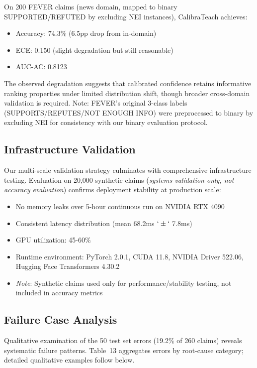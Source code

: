 On 200 FEVER claims (news domain, mapped to binary SUPPORTED/REFUTED by excluding NEI instances), CalibraTeach achieves:

\begin{itemize}
\item
  Accuracy: 74.3\% (6.5pp drop from in-domain)
\item
  ECE: 0.150 (slight degradation but still reasonable)
\item
  AUC-AC: 0.8123
\end{itemize}

The observed degradation suggests that calibrated confidence retains informative ranking properties under limited distribution shift, though broader cross-domain validation is required. Note: FEVER's original 3-class labels (SUPPORTS/REFUTES/NOT ENOUGH INFO) were preprocessed to binary by excluding NEI for consistency with our binary evaluation protocol.

\subsection{Infrastructure Validation}\label{infrastructure-validation}

Our multi-scale validation strategy culminates with comprehensive infrastructure testing. Evaluation on 20,000 synthetic claims (\emph{systems validation only, not accuracy evaluation}) confirms deployment stability at production scale:

\begin{itemize}
\item
  No memory leaks over 5-hour continuous run on NVIDIA RTX 4090
\item
  Consistent latency distribution (mean 68.2ms \(`\pm`\) 7.8ms)
\item
  GPU utilization: 45-60\%
\item
  Runtime environment: PyTorch 2.0.1, CUDA 11.8, NVIDIA Driver 522.06, Hugging Face Transformers 4.30.2
\item
  \emph{Note}: Synthetic claims used only for performance/stability testing, not included in accuracy metrics
\end{itemize}

\subsection{Failure Case Analysis}\label{failure-case-analysis}

Qualitative examination of the 50 test set errors (19.2\% of 260 claims) reveals systematic failure patterns. Table~13 aggregates errors by root-cause category; detailed qualitative examples follow below.

